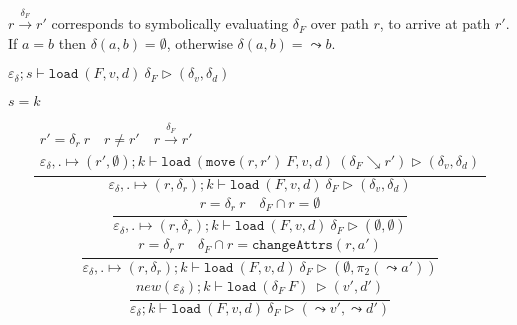 \documentclass[10pt,twoside,a4paper]{article}
\theoremstyle{theorem}
\theoremstyle{lemma}
\theoremstyle{property}
\begin{document}
$r \xrightarrow{\delta_F} r'$ corresponds to symbolically evaluating $\delta_F$ over path $r$, to arrive at path $r'$.
If $a = b$ then $\delta(a,b) = \emptyset$, otherwise $\delta(a,b) = \leadsto b$.


$\boxed{\varepsilon_\delta ; s \vdash \mathtt{load}~ (F,v,d)~ \delta_F \rhd (\delta_v,\delta_d)}$
	
$\boxed{s = k}$

\begin{displaymath}
	\frac{\begin{array}{c}
		r' = \delta_r ~ r \quad r \neq r' \quad r \xrightarrow{\delta_F} r'\\
		\varepsilon_\delta , . \mapsto (r',\emptyset) ; k \vdash \mathtt{load}~ (\mathtt{move} (r,r') ~ F,v,d)~ (\delta_F \searrow r') \rhd (\delta_v,\delta_d)
	\end{array}}
	{\varepsilon_\delta , . \mapsto (r,\delta_r) ; k \vdash \mathtt{load}~ (F,v,d)~ \delta_F \rhd (\delta_v,\delta_d)}
\end{displaymath}
\begin{displaymath}
	\frac{\begin{array}{c}
		r = \delta_r ~r \quad \delta_F \cap r = \emptyset
	\end{array}}
	{\varepsilon_\delta , . \mapsto (r,\delta_r) ; k \vdash \mathtt{load}~ (F,v,d)~ \delta_F \rhd (\emptyset,\emptyset)}
\end{displaymath}
\begin{displaymath}
	\frac{\begin{array}{c}
	r = \delta_r ~r \quad \delta_F \cap r = \mathtt{changeAttrs}(r,a')
	\end{array}}
	{\varepsilon_\delta , . \mapsto (r,\delta_r) ; k \vdash \mathtt{load}~ (F,v,d)~ \delta_F \rhd (\emptyset,\pi_2(\leadsto a'))}
\end{displaymath}
\begin{displaymath}
	\frac{\begin{array}{c}
		new(\varepsilon_\delta) ; k \vdash \mathtt{load}~ (\delta_F~ F)~  \rhd (v',d')
	\end{array}}
	{\varepsilon_\delta ; k \vdash \mathtt{load}~ (F,v,d)~ \delta_F \rhd (\leadsto v',\leadsto d')}
\end{displaymath}
\end{document}
